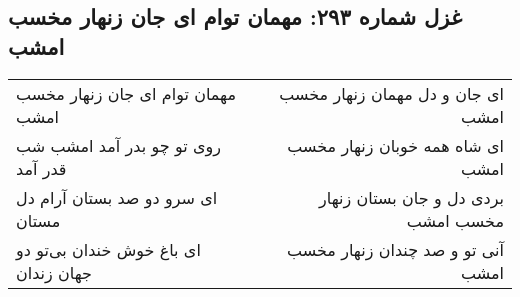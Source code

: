 \begin{center}
\section*{غزل شماره ۲۹۳: مهمان توام ای جان زنهار مخسب امشب}
\label{sec:0293}
\begin{longtable}{l p{0.5cm} r}
مهمان توام ای جان زنهار مخسب امشب
&&
ای جان و دل مهمان زنهار مخسب امشب
\\
روی تو چو بدر آمد امشب شب قدر آمد
&&
ای شاه همه خوبان زنهار مخسب امشب
\\
ای سرو دو صد بستان آرام دل مستان
&&
بردی دل و جان بستان زنهار مخسب امشب
\\
ای باغ خوش خندان بی‌تو دو جهان زندان
&&
آنی تو و صد چندان زنهار مخسب امشب
\\
\end{longtable}
\end{center}
